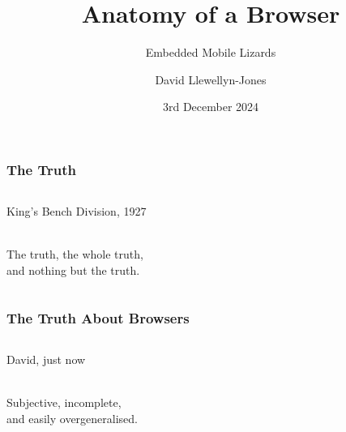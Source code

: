 \documentclass[
	notes=none,
	aspectratio=169
]{beamer}
\begin{document}
\title{Anatomy of a Browser}
\subtitle{Embedded Mobile Lizards}
\author{David Llewellyn-Jones}
\date{3rd December 2024}


\renewcommand{\thefootnote}{\arabic{footnote}}

\frame{
\titlepage
}
\note{
}

\renewcommand{\thefootnote}{\fnsymbol{footnote}}


\begin{frame}
\frametitle{The Truth}

\begin{columns}[T]
\begin{column}[T]{0.7\textwidth}
\setlength{\parskip}{0.5em}

\vspace{0.5cm}

\begin{shadequote}[r]{King's Bench Division, 1927}
\vspace{-0.3cm} \raggedright \\
{\huge \vphantom{Og}The truth, the whole truth, \\and nothing but the truth.} \\
\vspace{0.3cm}
\end{shadequote}

\end{column}
\end{columns}

\end{frame}
\note{
}


\begin{frame}
\frametitle{The Truth About Browsers}

\begin{columns}[T]
\begin{column}[T]{0.7\textwidth}
\setlength{\parskip}{0.5em}

\vspace{0.5cm}

\begin{shadequote}[r]{David, just now}
\vspace{-0.3cm} \raggedright \\
{\huge Subjective, incomplete, \\and easily overgeneralised.} \\
\vspace{0.3cm}
\end{shadequote}

\end{column}
\end{columns}

\end{frame}
\note{
}
\end{document}
